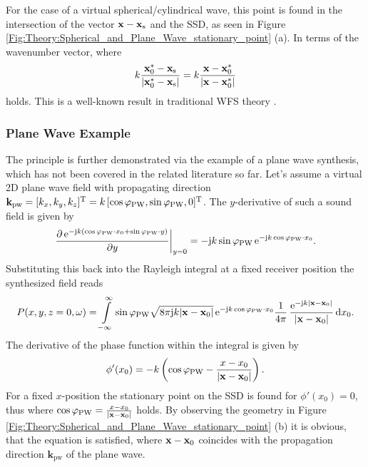 For the case of a virtual spherical/cylindrical wave, this point is found in the intersection of the vector $ \mathbf{x} - \mathbf{x}_{\mathrm{s}} $ and the SSD, as seen in Figure \ref{Fig:Theory:Spherical_and_Plane_Wave_stationary_point} (a).
In terms of the wavenumber vector, where
\begin{equation}
k \frac{\mathbf{x}_0^*-\mathbf{x}_{\mathrm{s}}}{|\mathbf{x}_0^*-\mathbf{x}_{\mathrm{s}}|} = k \frac{\mathbf{x}-\mathbf{x}_0^*}{|\mathbf{x}-\mathbf{x}_0^*|}
\end{equation}
holds.
This is a well-known result in traditional WFS theory \cite{Start1997:phd,Verheijen1997:phd}.
%
\subsubsection{Plane Wave Example}	
The principle is further demonstrated via the example of a plane wave synthesis, which has not been covered in the related literature so far.
Let's assume a virtual 2D plane wave field with propagating direction $\mathbf{k}_\text{pw}=[k_x,k_y,k_z]^{\mathrm{T}}=k\,[\cos\varphi_\text{PW},\sin\varphi_\text{PW},0]^{\mathrm{T}}$.
The $y$-derivative of such a sound field is given by
\begin{equation}
\left.
\frac{\partial\,\mathrm{e}^{-\mathrm{j} k ( \cos\varphi_\text{PW}\cdot x_0 + \sin\varphi_\text{PW}\cdot y )} }{\partial y} \right|_{ y = 0 } = -\mathrm{j} k \sin\varphi_\text{PW}\,\mathrm{e}^{-\mathrm{j} k \cos\varphi_\text{PW}\cdot x_0}.
\end{equation}
Substituting this back into the Rayleigh integral at a fixed receiver position the synthesized field reads
\begin{equation}
P(x,y,z=0,\omega) = \int\limits_{-\infty}^{\infty} \sin\varphi_\text{PW} \sqrt{8\pi \mathrm{j} k |\mathbf{x}-\mathbf{x}_0|}\,
\mathrm{e}^{-\mathrm{j} k \cos\varphi_\text{PW} \cdot x_0} \frac{1}{4\pi}\,\frac{\mathrm{e}^{-\mathrm{j} k |\mathbf{x} - \mathbf{x}_0|}}{|\mathbf{x} - \mathbf{x}_0|} \, \mathrm{d} x_0.\nonumber
\end{equation}
The derivative of the phase function within the integral is given by
\begin{equation}
\label{Eq:Phix0_PlaneWaveExample}
\phi'(x_0) = - k \left( \cos\varphi_\text{PW} - \frac{x-x_0}{|\mathbf{x} - \mathbf{x}_0|} \right).
\end{equation}
For a fixed $x$-position the stationary point on the SSD is found for $\phi'(x_0) = 0$, thus where $\cos\varphi_\text{PW} = \frac{x-x_0}{|\mathbf{x}-\mathbf{x}_0|}$ holds.
By observing the geometry in Figure \ref{Fig:Theory:Spherical_and_Plane_Wave_stationary_point} (b) it is obvious, that the equation is satisfied, where $\mathbf{x}-\mathbf{x}_0$ coincides with the propagation direction $\mathbf{k}_\text{pw}$ of the plane wave.


